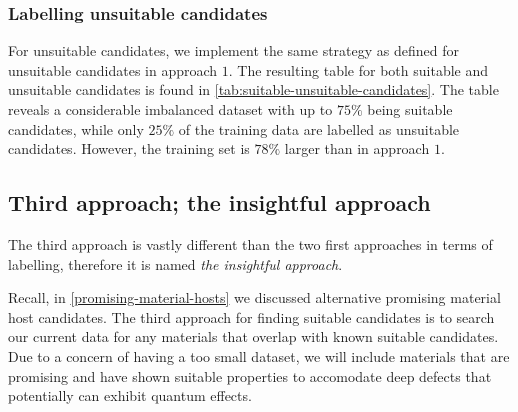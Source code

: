 \subsubsection{Labelling unsuitable candidates}

For unsuitable candidates, we implement the same strategy as defined for unsuitable candidates in approach $1$. The resulting table for both suitable and unsuitable candidates is found in \autoref{tab:suitable-unsuitable-candidates}. The table reveals a considerable imbalanced dataset with up to $75 \%$ being suitable candidates, while only $25 \%$ of the training data are labelled as unsuitable candidates. However, the training set is $78 \%$ larger than in approach $1$.

\begin{table}[!ht]
\centering
\caption{A table showing the number of entries through the data mining process for suitable candidates in approach $2$ and unsuitable candidates in approach $1$ and $2$.}
\label{tab:suitable-unsuitable-candidates}
\noindent{}
\end{table}

\subsection{Third approach; the insightful approach}

The third approach is vastly different than the two first approaches in terms of labelling, therefore it is named \textit{the insightful approach}.

Recall, in \autoref{promising-material-hosts} we discussed alternative promising material host candidates. The third approach for finding suitable candidates is to search our current data for any materials that overlap with known suitable candidates. Due to a concern of having a too small dataset, we will include materials that are promising and have shown suitable properties to accomodate deep defects that potentially can exhibit quantum effects.

